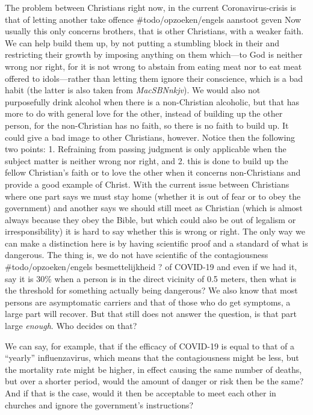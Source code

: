The problem between Christians right now, in the current
Coronavirus-crisis is that of letting another take offence
\#todo/opzoeken/engels aanstoot geven Now usually this only concerns
brothers, that is other Christians, with a weaker faith. We can help
build them up, by not putting a stumbling block in their and restricting
their growth by imposing anything on them which---to God is neither
wrong nor right, for it is not wrong to abstain from eating meat nor to
eat meat offered to idols---rather than letting them ignore their
conscience, which is a bad habit (the latter is also taken from
\emph{MacSBNnkjv}). We would also not purposefully drink alcohol when
there is a non-Christian alcoholic, but that has more to do with general
love for the other, instead of building up the other person, for the
non-Christian has no faith, so there is no faith to build up. It could
give a bad image to other Christians, however. Notice then the following
two points: 1. Refraining from passing judgment is only applicable when
the subject matter is neither wrong nor right, and 2. this is done to
build up the fellow Christian's faith or to love the other when it
concerns non-Christians and provide a good example of Christ. With the
current issue between Christians where one part says we must stay home
(whether it is out of fear or to obey the government) and another says
we should still meet as Christian (which is almost always because they
obey the Bible, but which could also be out of legalism or
irresponsibility) it is hard to say whether this is wrong or right. The
only way we can make a distinction here is by having scientific proof
and a standard of what is dangerous. The thing is, we do not have
scientific of the contagiousness \#todo/opzoeken/engels besmettelijkheid
? of COVID-19 and even if we had it, say it is 30\% when a person is in
the direct vicinity of 0.5 meters, then what is the threshold for
something actually being dangerous? We also know that most persons are
asymptomatic carriers and that of those who do get symptoms, a large
part will recover. But that still does not answer the question, is that
part large \emph{enough}. Who decides on that?

We can say, for example, that if the efficacy of COVID-19 is equal to
that of a ``yearly'' influenzavirus, which means that the contagiousness
might be less, but the mortality rate might be higher, in effect causing
the same number of deaths, but over a shorter period, would the amount
of danger or risk then be the same? And if that is the case, would it
then be acceptable to meet each other in churches and ignore the
government's instructions?

